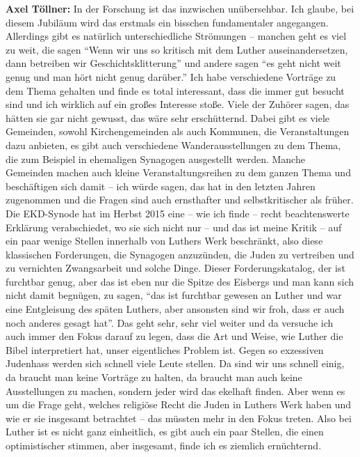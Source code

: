 \textbf{Axel Töllner:} In der Forschung ist das inzwischen unübersehbar. Ich glaube, bei diesem Jubiläum wird das erstmals ein bisschen fundamentaler angegangen. Allerdings gibt es natürlich unterschiedliche Strömungen – manchen geht es viel zu weit, die sagen "`Wenn wir uns so kritisch mit dem Luther auseinandersetzen, dann betreiben wir Geschichtsklitterung"' und andere sagen "`es geht nicht weit genug und man hört nicht genug darüber."' Ich habe verschiedene Vorträge zu dem Thema gehalten und finde es total interessant, dass die immer gut besucht sind und ich wirklich auf ein großes Interesse stoße. Viele der Zuhörer sagen, das hätten sie gar nicht gewusst, das wäre sehr erschütternd. Dabei gibt es viele Gemeinden, sowohl Kirchengemeinden als auch Kommunen, die Veranstaltungen dazu anbieten, es gibt auch verschiedene Wanderausstellungen zu dem Thema, die zum Beispiel in ehemaligen Synagogen ausgestellt werden. Manche Gemeinden machen auch kleine Veranstaltungsreihen zu dem ganzen Thema und beschäftigen sich damit – ich würde sagen, das hat in den letzten Jahren zugenommen und die Fragen sind auch ernsthafter und selbstkritischer als früher.  
Die EKD-Synode hat im Herbst 2015 eine – wie ich finde – recht beachtenswerte Erklärung verabschiedet, wo sie sich nicht nur – und das ist meine Kritik – auf ein paar wenige Stellen innerhalb von Luthers Werk beschränkt, also diese klassischen Forderungen, die Synagogen anzuzünden, die Juden zu vertreiben und zu vernichten Zwangsarbeit und solche Dinge. Dieser Forderungskatalog, der ist furchtbar genug, aber das ist eben nur die Spitze des Eisbergs und man kann sich nicht damit begnügen, zu sagen, "`das ist furchtbar gewesen an Luther und war eine Entgleisung des späten Luthers, aber ansonsten sind wir froh, dass er auch noch anderes gesagt hat"'. Das geht sehr, sehr viel weiter und da versuche ich auch immer den Fokus darauf zu legen, dass die Art und Weise, wie Luther die Bibel interpretiert hat, unser eigentliches Problem ist. 
Gegen so exzessiven Judenhass werden sich schnell viele Leute stellen. Da sind wir uns schnell einig, da braucht man keine Vorträge zu halten, da braucht man auch keine Ausstellungen zu machen, sondern jeder wird das ekelhaft finden. Aber wenn es um die Frage geht, welches religiöse Recht die Juden in Luthers Werk haben und wie er sie insgesamt betrachtet – das müssten mehr in den Fokus treten. Also bei Luther ist es nicht ganz einheitlich, es gibt auch ein paar Stellen, die einen optimistischer stimmen, aber insgesamt, finde ich es ziemlich ernüchternd. 
 
